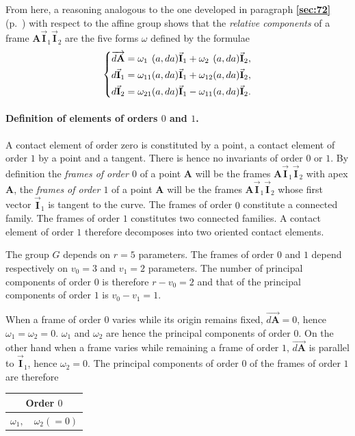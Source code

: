 \documentclass[leqno,11pt]{book}
\numberwithin{equation}{chapter}
\theoremstyle{shape1}
\theoremstyle{shapesmall}
\newcommand{\fsref}[1]{{\rm\textsection\textbf{\ref{sec:#1}}}}
\newcommand{\rvec}[1]{\vec{\mathbf{#1}}}
\newcommand{\ivec}{\rvec{I}}
\begin{document}
From here, a reasoning analogous to the one developed in paragraph \fsref{72} (p.~\pageref{sec:72}) with respect to the affine group shows that the \emph{relative components} of a frame $\mathbf{A}\ivec_{1}\ivec_{2}$ are the five forms $\omega$ defined by the formulae
\begin{equation}
  \label{eq:10.2.3}
  \left\{
    \begin{aligned}
      \overrightarrow{d\mathbf{A}}&=\omega_{1\hphantom{0}}(a,da)\ivec_{1}+\omega_{2\hphantom{0}}(a,da)\ivec_{2},\\
      d\ivec_{1}&=\omega_{11}(a,da)\ivec_{1}+\omega_{12}(a,da)\ivec_{2},\\
      d\ivec_{2}&=\omega_{21}(a,da)\ivec_{1}-\omega_{11}(a,da)\ivec_{2}.
    \end{aligned}
  \right.
\end{equation}

\paragraph{Definition of elements of orders $0$ and $1$.}
\label{sec:134}
A contact element of order zero is constituted by a point, a contact element of order $1$ by a point and a tangent. There is hence no invariants of order $0$ or $1$. By definition the \emph{frames of order $0$} of a point $\mathbf{A}$ will be the frames $\mathbf{A}\ivec_{1}\ivec_{2}$ with apex $\mathbf{A}$, the \emph{frames of order $1$} of a point $\mathbf{A}$ will be the frames $\mathbf{A}\ivec_{1}\ivec_{2}$ whose first vector $\ivec_{1}$ is tangent to the curve. The frames of order $0$ constitute a connected family. The frames of order $1$ constitutes two connected families. A contact element of order $1$ therefore decomposes into two oriented contact elements.

The group $G$ depends on $r=5$ parameters. The frames of order $0$ and $1$ depend respectively on $v_{0}=3$ and $v_{1}=2$ parameters. The number of principal components of order $0$ is therefore $r-v_{0}=2$ and that of the principal components of order $1$ is $v_{0}-v_{1}=1$.

When a frame of order $0$ varies while its origin remains fixed, $\overrightarrow{d\mathbf{A}}=0$, hence $\omega_{1}=\omega_{2}=0$. $\omega_{1}$ and $\omega_{2}$ are hence the principal components of order $0$. On the other hand when a frame varies while remaining a frame of order $1$, $\overrightarrow{d\mathbf{A}}$ is parallel to $\ivec_{1}$, hence $\omega_{2}=0$. The principal components of order $0$ of the frames of order $1$ are therefore
\begin{center}  
\begin{tabular}{|c|}
  \hline
  Order $0$\\
  \hline
  $\omega_{1},\quad\omega_{2}(=0)$\\
  \hline
\end{tabular}
\end{center}
\end{document}
